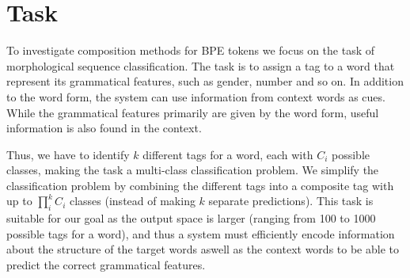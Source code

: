 \documentclass[11pt]{article}
\begin{document}

    \section{Task}

        To investigate composition methods for BPE tokens we focus on
     the task of morphological sequence classification. The task is to
     assign a tag to a word that represent its grammatical
     features, such as gender, number and so on.
            In addition to the word form, the system can use
     information from context words as cues. While the grammatical
     features primarily are given by the word form, useful information
     is also found in the context.


        Thus, we have to identify $k$ different tags for a word, each
     with $C_i$ possible classes, making the task a multi-class
     classification problem. We simplify the classification problem by
     combining the different tags into a composite tag with up to
     $\prod _i^k C_i$ classes (instead of making $k$ separate
     predictions).
                This task is suitable for our goal as the output space
     is larger (ranging from 100 to 1000 possible tags for a word),
     and thus a system must efficiently encode information about the
     structure of the target words aswell as the context words to be
     able to predict the correct grammatical features.
    
\end{document}
